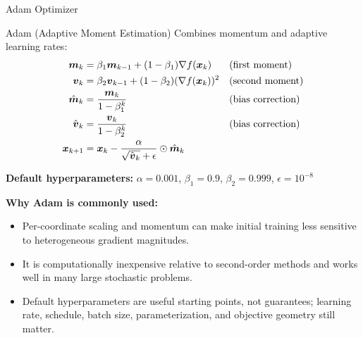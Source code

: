 \documentclass[aspectratio=169]{beamer}
\begin{document}
\begin{frame}{Adam Optimizer}
  \begin{definitionbox}{Adam (Adaptive Moment Estimation)}
    Combines momentum and adaptive learning rates:
    \begin{align*}
      \boldsymbol{m}_k &= \beta_1 \boldsymbol{m}_{k-1} + (1-\beta_1) \nabla f(\boldsymbol{x}_k) && \text{(first moment)} \\
      \boldsymbol{v}_k &= \beta_2 \boldsymbol{v}_{k-1} + (1-\beta_2) (\nabla f(\boldsymbol{x}_k))^2 && \text{(second moment)} \\
      \hat{\boldsymbol{m}}_k &= \frac{\boldsymbol{m}_k}{1-\beta_1^k} && \text{(bias correction)} \\
      \hat{\boldsymbol{v}}_k &= \frac{\boldsymbol{v}_k}{1-\beta_2^k} && \text{(bias correction)} \\
      \boldsymbol{x}_{k+1} &= \boldsymbol{x}_k - \frac{\alpha}{\sqrt{\hat{\boldsymbol{v}}_k} + \epsilon} \odot \hat{\boldsymbol{m}}_k
    \end{align*}

    \textbf{Default hyperparameters:} $\alpha = 0.001$, $\beta_1 = 0.9$, $\beta_2 = 0.999$, $\epsilon = 10^{-8}$
  \end{definitionbox}

  \vspace{0.5em}

  \textbf{Why Adam is commonly used:}
  \begin{itemize}
    \item Per-coordinate scaling and momentum can make initial training less sensitive to heterogeneous gradient magnitudes.
    \item It is computationally inexpensive relative to second-order methods and works well in many large stochastic problems.
    \item Default hyperparameters are useful starting points, not guarantees; learning rate, schedule, batch size, parameterization, and objective geometry still matter.
  \end{itemize}
\end{frame}
\end{document}
